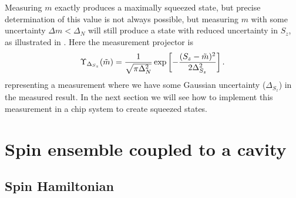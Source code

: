 
Measuring $m$ exactly produces a maximally squeezed state, but precise
determination of this value is not always possible, but measuring $m$ with some
uncertainty $\Delta m < \Delta_N$ will still produce a state with reduced
uncertainty in $S_z$, as illustrated in . Here the
measurement projector is ~\cite{MAURODARIANO2003205, Vanner16182, Cox2016}
%
\begin{equation}
  \Upsilon_{\Delta_{S_z}}(\tilde{m}) = \frac{1}{\sqrt{\pi\Delta_N^2}}\exp\left[
    -\frac{(S_z-\tilde{m})^2}{2\Delta_{S_z}^2}\right].
  \label{squeeze:eqn:squeezeproj}
\end{equation}
%
representing a measurement where we have some Gaussian uncertainty
($\Delta_{S_z}$) in the measured result.  In the next section we will see how
to implement this measurement in a \CaF{} chip system to create squeezed
states.

\section{Spin ensemble coupled to a cavity}

\subsection{Spin Hamiltonian}

